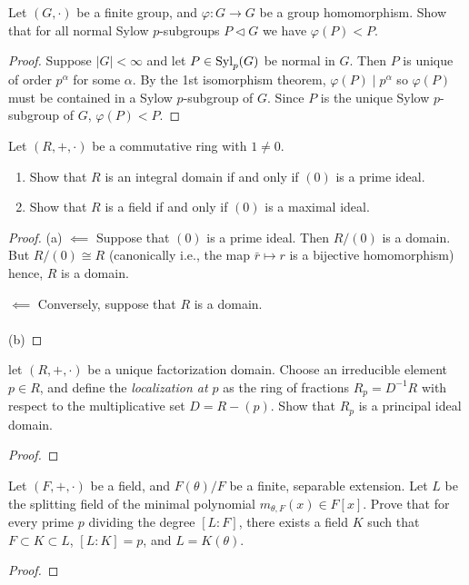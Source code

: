 \begin{problem}
Let $(G,\cdot)$ be a finite group, and $\varphi\colon G\to G$ be a group
homomorphism. Show that for all normal Sylow $p$-subgroups $P\lhd G$ we
have $\varphi(P)<P$.
\end{problem}
\begin{proof}
Suppose $|G|<\infty$ and let $P\in\operatorname{Syl}_p(G)$ be normal in $G$. Then $P$ is
unique of order $p^\alpha$ for some $\alpha$. By the 1st isomorphism
theorem, $\varphi(P)\mid p^\alpha$ so $\varphi(P)$ must be contained in a
Sylow $p$-subgroup of $G$. Since $P$ is the unique Sylow $p$-subgroup of
$G$, $\varphi(P)<P$.
\end{proof}

\begin{problem}
Let $(R,+,\cdot)$ be a commutative ring with $1\neq 0$.
\begin{enumerate}[noitemsep,label=(\alph*)]
\item Show that $R$ is an integral domain if and only if $(0)$ is a prime
  ideal.
\item Show that $R$ is a field if and only if $(0)$ is a maximal ideal.
\end{enumerate}
\end{problem}
\begin{proof}
(a) $\impliedby$ Suppose that $(0)$ is a prime ideal. Then $R/(0)$ is a
domain. But $R/(0)\cong R$ (canonically i.e., the map $\bar r\mapsto r$ is a
bijective homomorphism) hence, $R$ is a domain.

$\impliedby$ Conversely, suppose that $R$ is a domain.
\\\\
(b)
\end{proof}

\begin{problem}
let $(R,+,\cdot)$ be a unique factorization domain. Choose an irreducible
element $p\in R$, and define the \emph{localization at $p$} as the ring of
fractions $R_p=D^{-1}R$ with respect to the multiplicative set
$D=R-(p)$. Show that $R_p$ is a principal ideal domain.
\end{problem}
\begin{proof}
\end{proof}

\begin{problem}
Let $(F,+,\cdot)$ be a field, and $F(\theta)/F$ be a finite, separable
extension. Let $L$ be the splitting field of the minimal polynomial
$m_{\theta,F}(x)\in F[x]$. Prove that for every prime $p$ dividing the
degree $[L:F]$, there exists a field $K$ such that $F\subset K\subset L$,
$[L:K]=p$, and $L=K(\theta)$.
\end{problem}
\begin{proof}
\end{proof}

